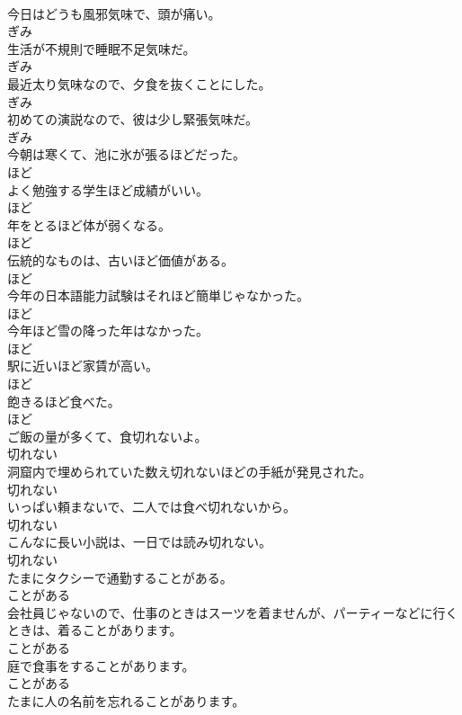 \documentclass[8pt]{extreport}
\begin{document}
\begin{CJK}{UTF8}{min}
\\	今日はどうも風邪気味で、頭が痛い。	
\\	ぎみ
\\	生活が不規則で睡眠不足気味だ。	
\\	ぎみ
\\	最近太り気味なので、夕食を抜くことにした。	
\\	ぎみ
\\	初めての演説なので、彼は少し緊張気味だ。	
\\	ぎみ
\\	今朝は寒くて、池に氷が張るほどだった。	
\\	ほど
\\	よく勉強する学生ほど成績がいい。	
\\	ほど
\\	年をとるほど体が弱くなる。	
\\	ほど
\\	伝統的なものは、古いほど価値がある。	
\\	ほど
\\	今年の日本語能力試験はそれほど簡単じゃなかった。	
\\	ほど
\\	今年ほど雪の降った年はなかった。	
\\	ほど
\\	駅に近いほど家賃が高い。	
\\	ほど
\\	飽きるほど食べた。	
\\	ほど
\\	ご飯の量が多くて、食切れないよ。	
\\	切れない
\\	洞窟内で埋められていた数え切れないほどの手紙が発見された。	
\\	切れない
\\	いっぱい頼まないで、二人では食べ切れないから。	
\\	切れない
\\	こんなに長い小説は、一日では読み切れない。	
\\	切れない
\\	たまにタクシーで通勤することがある。	
\\	ことがある
\\	会社員じゃないので、仕事のときはスーツを着ませんが、パーティーなどに行くときは、着ることがあります。	
\\	ことがある
\\	庭で食事をすることがあります。	
\\	ことがある
\\	たまに人の名前を忘れることがあります。	

\end{CJK}
\end{document}
